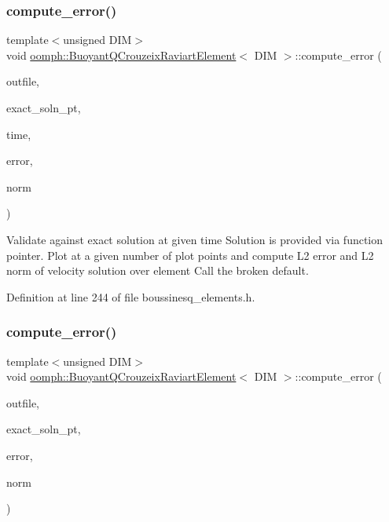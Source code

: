 \subsubsection{\texorpdfstring{compute\+\_\+error()}{compute\_error()}\hspace{0.1cm}{\footnotesize\ttfamily [1/2]}}
{\footnotesize\ttfamily template$<$unsigned D\+IM$>$ \\
void \hyperlink{classoomph_1_1BuoyantQCrouzeixRaviartElement}{oomph\+::\+Buoyant\+Q\+Crouzeix\+Raviart\+Element}$<$ D\+IM $>$\+::compute\+\_\+error (\begin{DoxyParamCaption}\item[{std\+::ostream \&}]{outfile,  }\item[{Finite\+Element\+::\+Unsteady\+Exact\+Solution\+Fct\+Pt}]{exact\+\_\+soln\+\_\+pt,  }\item[{const double \&}]{time,  }\item[{double \&}]{error,  }\item[{double \&}]{norm }\end{DoxyParamCaption})\hspace{0.3cm}{\ttfamily [inline]}}



Validate against exact solution at given time Solution is provided via function pointer. Plot at a given number of plot points and compute L2 error and L2 norm of velocity solution over element Call the broken default. 



Definition at line 244 of file boussinesq\+\_\+elements.\+h.

\mbox{\label{classoomph_1_1BuoyantQCrouzeixRaviartElement_a2aa63b1b2ec1130835ee87cbf52cc086}} 
\subsubsection{\texorpdfstring{compute\+\_\+error()}{compute\_error()}\hspace{0.1cm}{\footnotesize\ttfamily [2/2]}}
{\footnotesize\ttfamily template$<$unsigned D\+IM$>$ \\
void \hyperlink{classoomph_1_1BuoyantQCrouzeixRaviartElement}{oomph\+::\+Buoyant\+Q\+Crouzeix\+Raviart\+Element}$<$ D\+IM $>$\+::compute\+\_\+error (\begin{DoxyParamCaption}\item[{std\+::ostream \&}]{outfile,  }\item[{Finite\+Element\+::\+Steady\+Exact\+Solution\+Fct\+Pt}]{exact\+\_\+soln\+\_\+pt,  }\item[{double \&}]{error,  }\item[{double \&}]{norm }\end{DoxyParamCaption})\hspace{0.3cm}{\ttfamily [inline]}}



